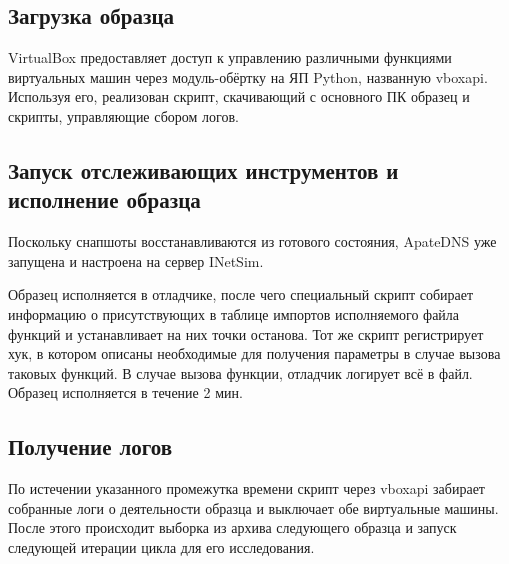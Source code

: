 \subsection {Загрузка образца}
VirtualBox предоставляет доступ к управлению различными функциями виртуальных машин через модуль-обёртку на ЯП Python, названную vboxapi. Используя его, реализован скрипт, скачивающий с основного ПК образец и скрипты, управляющие сбором логов.
\subsection {Запуск отслеживающих инструментов и исполнение образца}
Поскольку снапшоты восстанавливаются из готового состояния, ApateDNS уже запущена и настроена на сервер INetSim.

Образец исполняется в отладчике, после чего специальный скрипт собирает информацию о присутствующих в таблице импортов исполняемого файла функций и устанавливает на них точки останова. Тот же скрипт регистрирует хук, в котором описаны необходимые для получения параметры в случае вызова таковых функций.
В случае вызова функции, отладчик логирует всё в файл. Образец исполняется в течение 2 мин.
\subsection {Получение логов}
По истечении указанного промежутка времени скрипт через vboxapi забирает собранные логи о деятельности образца и выключает обе виртуальные машины. После этого происходит выборка из архива следующего образца и запуск следующей итерации цикла для его исследования.



 
